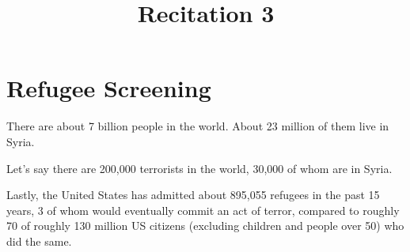 \documentclass{article}
\begin{document}
\title{Recitation 3}

\maketitle

\section{Refugee Screening}

There are about 7 billion people in the world. About 23 million of them live in Syria.

Let's say there are 200,000 terrorists in the world, 30,000 of whom are in Syria.

Lastly, the United States has admitted about 895,055 refugees in the past 15 years, 3 of whom would eventually commit an act of terror, compared to roughly 70 of roughly 130 million US citizens (excluding children and people over 50) who did the same.
\end{document}

